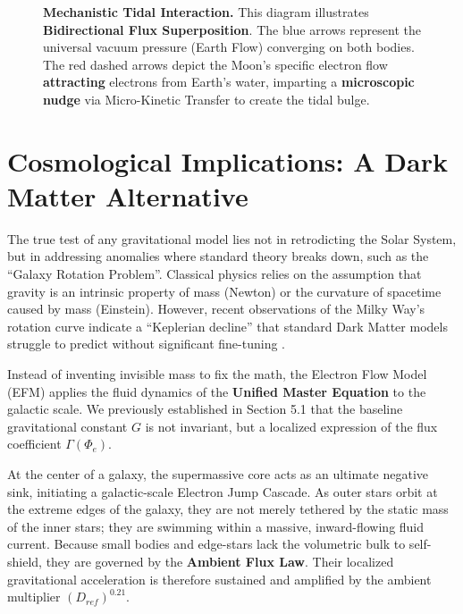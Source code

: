 \documentclass[11pt, a4paper]{article}
\begin{document}
\begin{figure}[!ht]
\caption{\textbf{Mechanistic Tidal Interaction.} This diagram illustrates \textbf{Bidirectional Flux Superposition}. The blue arrows represent the universal vacuum pressure (Earth Flow) converging on both bodies. The red dashed arrows depict the Moon's specific electron flow \textbf{attracting} electrons from Earth's water, imparting a \textbf{microscopic nudge} via Micro-Kinetic Transfer to create the tidal bulge.}
\label{fig:tidal_mechanism}
\end{figure}

\clearpage
\section{Cosmological Implications: A Dark Matter Alternative}

  The true test of any gravitational model lies not in retrodicting the Solar System, but in addressing anomalies where standard theory breaks down, such as the ``Galaxy Rotation Problem''. Classical physics relies on the assumption that gravity is an intrinsic property of mass (Newton) or the curvature of spacetime caused by mass (Einstein). However, recent observations of the Milky Way's rotation curve \cite{Jiao2023} indicate a ``Keplerian decline'' that standard Dark Matter models struggle to predict without significant fine-tuning \cite{Bullock2017}.

  Instead of inventing invisible mass to fix the math, the Electron Flow Model (EFM) applies the fluid dynamics of the \textbf{Unified Master Equation} to the galactic scale. We previously established in Section 5.1 that the baseline gravitational constant $G$ is not invariant, but a localized expression of the flux coefficient $\Gamma(\Phi_e)$.

  At the center of a galaxy, the supermassive core acts as an ultimate negative sink, initiating a galactic-scale Electron Jump Cascade. As outer stars orbit at the extreme edges of the galaxy, they are not merely tethered by the static mass of the inner stars; they are swimming within a massive, inward-flowing fluid current. Because small bodies and edge-stars lack the volumetric bulk to self-shield, they are governed by the \textbf{Ambient Flux Law}. Their localized gravitational acceleration is therefore sustained and amplified by the ambient multiplier $(D_{ref})^{0.21}$. 
\end{document}
